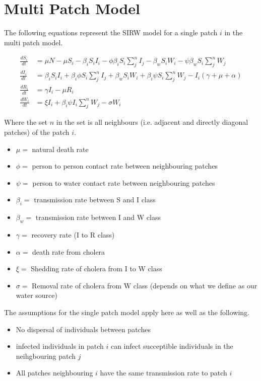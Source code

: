 \documentclass[12pt]{article}\usepackage[]{graphicx}\usepackage[]{color}
\begin{document}
\section{Multi Patch Model}

The following equations represent the SIRW model for a single patch $i$ in the multi patch model.
\begin{linenomath}
\begin{align*}
    \frac{dS_i}{dt}&= \mu N - \mu S_i - \beta_i S_i I_i - \phi \beta_i S_i \sum_j^n I_j - \beta_w S_i W_i - \psi \beta_w S_i \sum_j^n W_j\\
    \frac{dI_i}{dt}&= \beta_i S_i I_i + \beta_i \phi S_i \sum_j^n I_j + \beta_w S_i W_i + \beta_i \psi S_i \sum_j^n W_j - I_i (\gamma + \mu + \alpha) \\
    \frac{dR_i}{dt}&= \gamma I_i - \mu R_i \\
    \frac{dW_i}{dt}&= \xi I_i + \beta_i \psi I_i \sum_j^n W_j  - \sigma W_i
\end{align*}
\end{linenomath}
Where the set $n$ in the set is all neighbours (i.e. adjacent and directly diagonal patches) of the patch $i$.

\begin{itemize}
    \item$\mu=$ natural death rate
    \item$\phi=$ person to person contact rate between neighbouring patches
    \item$\psi=$ person to water contact rate between neighbouring patches
    \item$\beta_i=$ transmission rate between S and I class
    \item$\beta_w=$ transmission rate between I and W class
    \item$\gamma=$ recovery rate (I to R class)
    \item$\alpha=$ death rate from cholera
    \item$\xi=$ Shedding rate of cholera from I to W class
    \item$\sigma=$	Removal rate of cholera from W class (depends on what we define as our water source)
\end{itemize}
The assumptions for the single patch model apply here as well as the following.
\begin{itemize}
    \item No dispersal of individuals between patches
    \item infected individuals in patch $i$ can infect succeptible individuals in the neihgbouring patch $j$
    \item All patches neighbouring $i$ have the same transmission rate to patch $i$
\end{itemize}
\end{document}
